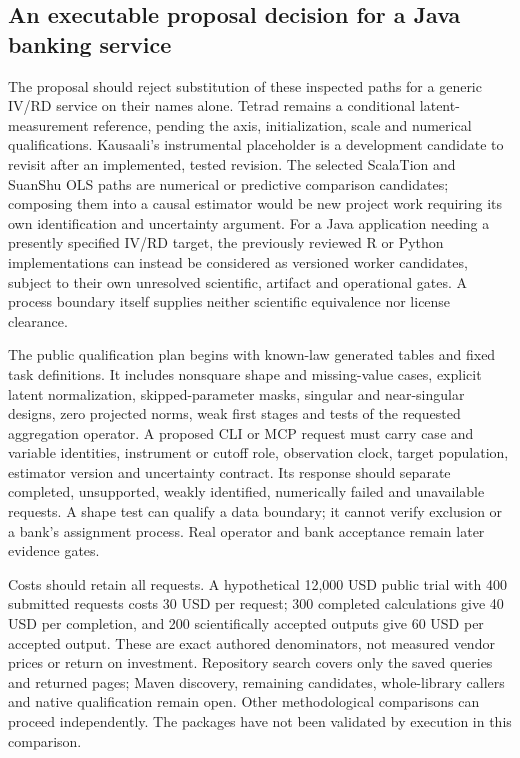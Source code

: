 \subsection{An executable proposal decision for a Java banking service}

The proposal should reject substitution of these inspected paths for a generic IV/RD service on their names alone. Tetrad remains a conditional latent-measurement reference, pending the axis, initialization, scale and numerical qualifications. Kausaali's instrumental placeholder is a development candidate to revisit after an implemented, tested revision. The selected ScalaTion and SuanShu OLS paths are numerical or predictive comparison candidates; composing them into a causal estimator would be new project work requiring its own identification and uncertainty argument. For a Java application needing a presently specified IV/RD target, the previously reviewed R or Python implementations can instead be considered as versioned worker candidates, subject to their own unresolved scientific, artifact and operational gates. A process boundary itself supplies neither scientific equivalence nor license clearance.\citep{exec25_javaiv_choice,exec25_pyrdiv_choice}

The public qualification plan begins with known-law generated tables and fixed task definitions. It includes nonsquare shape and missing-value cases, explicit latent normalization, skipped-parameter masks, singular and near-singular designs, zero projected norms, weak first stages and tests of the requested aggregation operator. A proposed CLI or MCP request must carry case and variable identities, instrument or cutoff role, observation clock, target population, estimator version and uncertainty contract. Its response should separate completed, unsupported, weakly identified, numerically failed and unavailable requests. A shape test can qualify a data boundary; it cannot verify exclusion or a bank's assignment process. Real operator and bank acceptance remain later evidence gates.

Costs should retain all requests. A hypothetical 12,000 USD public trial with 400 submitted requests costs 30 USD per request; 300 completed calculations give 40 USD per completion, and 200 scientifically accepted outputs give 60 USD per accepted output. These are exact authored denominators, not measured vendor prices or return on investment. Repository search covers only the saved queries and returned pages; Maven discovery, remaining candidates, whole-library callers and native qualification remain open. Other methodological comparisons can proceed independently. The packages have not been validated by execution in this comparison.\citep{exec25_javaiv_choice}
